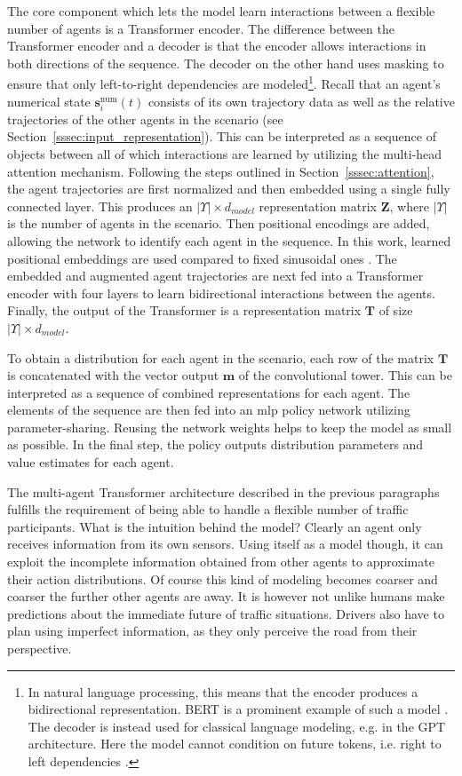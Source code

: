 The core component which lets the model learn interactions between a flexible number of agents is a Transformer encoder. The difference between the Transformer encoder and a decoder is that the encoder allows interactions in both directions of the sequence. The decoder on the other hand uses masking to ensure that only left-to-right dependencies are modeled\footnote{In natural language processing, this means that the encoder produces a bidirectional representation. BERT is a prominent example of such a model \cite{devlinBERTPretrainingDeep2019}. The decoder is instead used for classical language modeling, e.g. in the GPT architecture. Here the model cannot condition on future tokens, i.e. right to left dependencies \cite{devlinBERTPretrainingDeep2019}.}. Recall that an agent's numerical state $\mathbf s_i^{\text{num}} (t)$ consists of its own trajectory data as well as the relative trajectories of the other agents in the scenario (see Section~\ref{sssec:input_representation}). This can be interpreted as a sequence of objects between all of which interactions are learned by utilizing the multi-head attention mechanism. Following the steps outlined in Section~\ref{sssec:attention}, the agent trajectories are first normalized and then embedded using a single fully connected layer. This produces an $|\Upsilon| \times d_{model}$ representation matrix $\mathbf Z$, where $|\Upsilon|$ is the number of agents in the scenario. Then positional encodings are added, allowing the network to identify each agent in the sequence. In this work, learned positional embeddings are used compared to fixed sinusoidal ones \cite{devlinBERTPretrainingDeep2019}. The embedded and augmented agent trajectories are next fed into a Transformer encoder with four layers to learn bidirectional interactions between the agents. Finally, the output of the Transformer is a representation matrix $\mathbf T$ of size $|\Upsilon| \times d_{model}$.

To obtain a distribution for each agent in the scenario, each row of the matrix $\mathbf T$ is concatenated with the vector output $\mathbf m$ of the convolutional tower. This can be interpreted as a sequence of combined representations for each agent. The elements of the sequence are then fed into an \gls{mlp} policy network utilizing parameter-sharing. Reusing the network weights helps to keep the model as small as possible. In the final step, the policy outputs distribution parameters and value estimates for each agent.

The multi-agent Transformer architecture described in the previous paragraphs fulfills the requirement of being able to handle a flexible number of traffic participants. What is the intuition behind the model? Clearly an agent only receives information from its own sensors. Using itself as a model though, it can exploit the incomplete information obtained from other agents to approximate their action distributions. Of course this kind of modeling becomes coarser and coarser the further other agents are away. It is however not unlike humans make predictions about the immediate future of traffic situations. Drivers also have to plan using imperfect information, as they only perceive the road from their perspective.

